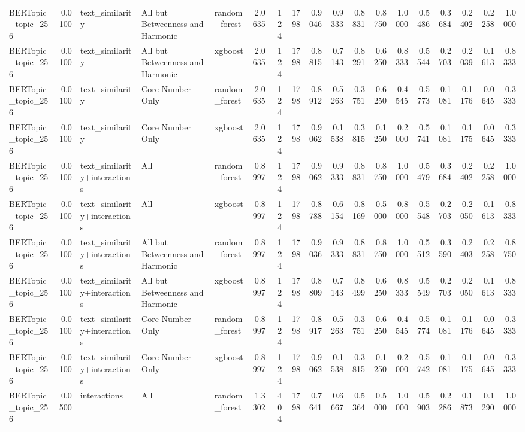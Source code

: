 \begin{tabular}{lrlllrrrrrrrrrrrrr}
BERTopic_topic_256 & 0.0100 & text_similarity & All but Betweenness and Harmonic & random_forest & 2.0635 & 124 & 1798 & 0.9046 & 0.9333 & 0.8831 & 0.8750 & 1.0000 & 0.5486 & 0.3684 & 0.2402 & 0.2258 & 1.0000 \\
BERTopic_topic_256 & 0.0100 & text_similarity & All but Betweenness and Harmonic & xgboost & 2.0635 & 124 & 1798 & 0.8815 & 0.7143 & 0.8291 & 0.6250 & 0.8333 & 0.5544 & 0.2703 & 0.2039 & 0.1613 & 0.8333 \\
BERTopic_topic_256 & 0.0100 & text_similarity & Core Number Only & random_forest & 2.0635 & 124 & 1798 & 0.8912 & 0.5263 & 0.3751 & 0.6250 & 0.4545 & 0.5773 & 0.1081 & 0.1176 & 0.0645 & 0.3333 \\
BERTopic_topic_256 & 0.0100 & text_similarity & Core Number Only & xgboost & 2.0635 & 124 & 1798 & 0.9062 & 0.1538 & 0.3815 & 0.1250 & 0.2000 & 0.5741 & 0.1081 & 0.1175 & 0.0645 & 0.3333 \\
BERTopic_topic_256 & 0.0100 & text_similarity+interactions & All & random_forest & 0.8997 & 124 & 1798 & 0.9062 & 0.9333 & 0.8831 & 0.8750 & 1.0000 & 0.5479 & 0.3684 & 0.2402 & 0.2258 & 1.0000 \\
BERTopic_topic_256 & 0.0100 & text_similarity+interactions & All & xgboost & 0.8997 & 124 & 1798 & 0.8788 & 0.6154 & 0.8169 & 0.5000 & 0.8000 & 0.5548 & 0.2703 & 0.2050 & 0.1613 & 0.8333 \\
BERTopic_topic_256 & 0.0100 & text_similarity+interactions & All but Betweenness and Harmonic & random_forest & 0.8997 & 124 & 1798 & 0.9036 & 0.9333 & 0.8831 & 0.8750 & 1.0000 & 0.5512 & 0.3590 & 0.2403 & 0.2258 & 0.8750 \\
BERTopic_topic_256 & 0.0100 & text_similarity+interactions & All but Betweenness and Harmonic & xgboost & 0.8997 & 124 & 1798 & 0.8809 & 0.7143 & 0.8499 & 0.6250 & 0.8333 & 0.5549 & 0.2703 & 0.2050 & 0.1613 & 0.8333 \\
BERTopic_topic_256 & 0.0100 & text_similarity+interactions & Core Number Only & random_forest & 0.8997 & 124 & 1798 & 0.8917 & 0.5263 & 0.3751 & 0.6250 & 0.4545 & 0.5774 & 0.1081 & 0.1176 & 0.0645 & 0.3333 \\
BERTopic_topic_256 & 0.0100 & text_similarity+interactions & Core Number Only & xgboost & 0.8997 & 124 & 1798 & 0.9062 & 0.1538 & 0.3815 & 0.1250 & 0.2000 & 0.5742 & 0.1081 & 0.1175 & 0.0645 & 0.3333 \\
BERTopic_topic_256 & 0.0500 & interactions & All & random_forest & 1.3302 & 404 & 1798 & 0.7641 & 0.6667 & 0.5364 & 0.5000 & 1.0000 & 0.5903 & 0.2286 & 0.1873 & 0.1290 & 1.0000 \\

\end{tabular}
